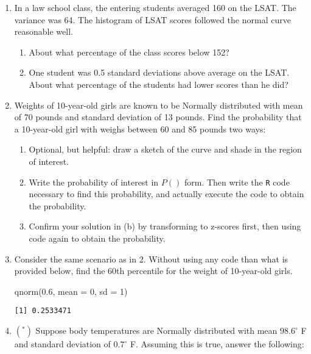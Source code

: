 \documentclass[
  letterpaper,
  DIV=11,
  numbers=noendperiod]{scrartcl}
\newenvironment{Shaded}{\begin{snugshade}}{\end{snugshade}}
\newcommand{\AttributeTok}[1]{\textcolor[rgb]{0.40,0.45,0.13}{#1}}
\newcommand{\DecValTok}[1]{\textcolor[rgb]{0.68,0.00,0.00}{#1}}
\newcommand{\FloatTok}[1]{\textcolor[rgb]{0.68,0.00,0.00}{#1}}
\newcommand{\FunctionTok}[1]{\textcolor[rgb]{0.28,0.35,0.67}{#1}}
\newcommand{\NormalTok}[1]{\textcolor[rgb]{0.00,0.23,0.31}{#1}}
\begin{document}
\begin{enumerate}
\def\labelenumi{\arabic{enumi}.}
\item
  In a law school class, the entering students averaged 160 on the LSAT.
  The variance was 64. The histogram of LSAT scores followed the normal
  curve reasonable well.

  \begin{enumerate}
  \def\labelenumii{\alph{enumii}.}
  \item
    About what percentage of the class scores below 152?
  \item
    One student was 0.5 standard deviations above average on the LSAT.
    About what percentage of the students had lower scores than he did?
  \end{enumerate}
\item
  Weights of 10-year-old girls are known to be Normally distributed with
  mean of 70 pounds and standard deviation of 13 pounds. Find the
  probability that a 10-year-old girl with weighs between 60 and 85
  pounds two ways:

  \begin{enumerate}
  \def\labelenumii{\alph{enumii}.}
  \item
    Optional, but helpful: draw a sketch of the curve and shade in the
    region of interest.
  \item
    Write the probability of interest in \(P()\) form. Then write the
    \texttt{R} code necessary to find this probability, and actually
    execute the code to obtain the probability.
  \item
    Confirm your solution in (b) by transforming to z-scores first, then
    using code again to obtain the probability.
  \end{enumerate}
\item
  Consider the same scenario as in 2. Without using any code than what
  is provided below, find the 60th percentile for the weight of
  10-year-old girls.

\begin{Shaded}
\begin{Highlighting}[]
\FunctionTok{qnorm}\NormalTok{(}\FloatTok{0.6}\NormalTok{, }\AttributeTok{mean =} \DecValTok{0}\NormalTok{, }\AttributeTok{sd =} \DecValTok{1}\NormalTok{)}
\end{Highlighting}
\end{Shaded}

\begin{verbatim}
[1] 0.2533471
\end{verbatim}
\item
  \((^*)\) Suppose body temperatures are Normally distributed with mean
  \(98.6^\circ\) F and standard deviation of \(0.7^\circ\) F. Assuming
  this is true, answer the following:


\end{enumerate}
\end{document}
